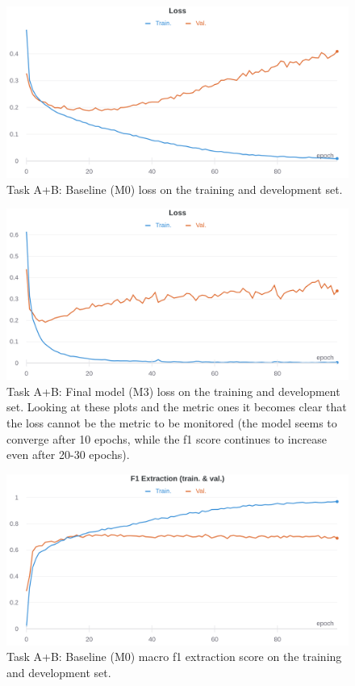 \documentclass[11pt,a4paper]{article}
\begin{document}
	\begin{figure}[H]
		\centering
		\includegraphics[width=1\columnwidth]{M0_ab_loss.png}
		\caption{Task A+B: Baseline (M0) loss on the training and development set.}
		\label{fig:M0_loss}
	\end{figure}
	
	\begin{figure}[H]
		\centering
		\includegraphics[width=1\columnwidth]{M3_ab_loss.png}
		\caption{Task A+B: Final model (M3) loss on the training and development set. Looking at these plots and the metric ones it becomes clear that the loss cannot be the metric to be monitored (the model seems to converge after 10 epochs, while the f1 score continues to increase even after 20-30 epochs).}
		\label{fig:M3_loss}
	\end{figure}
	
	\begin{figure}[H]
		\centering
		\includegraphics[width=1\columnwidth]{M0_ab_f1_extr.png}
		\caption{Task A+B: Baseline (M0) macro f1 extraction score on the training and
			development set.}
		\label{fig:M0_extr}
	\end{figure}
	
\end{document}
